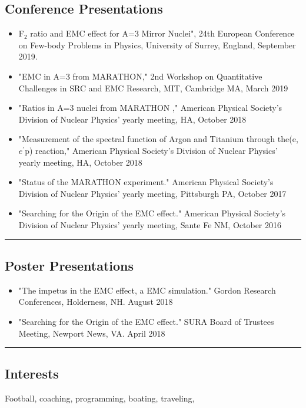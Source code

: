 \subsection*{Conference Presentations}
\begin{itemize}
\item F$_2$ ratio and EMC effect for A=3 Mirror Nuclei", 24th European Conference on Few-body Problems in Physics, University of Surrey, England, September 2019.
\item "EMC in A=3 from MARATHON," 2nd Workshop on Quantitative Challenges in SRC and EMC Research,  MIT, Cambridge MA,  March 2019
\item "Ratios in A=3 nuclei from MARATHON ," American Physical Society's Division of Nuclear Physics' yearly meeting, HA, October 2018
\item "Measurement of the spectral function of Argon and Titanium through the(e,$e^\prime$p) reaction," American Physical Society's Division of Nuclear Physics' yearly meeting, HA, October 2018
\item "Status of the MARATHON experiment." American Physical Society's Division of Nuclear Physics' yearly meeting, Pittsburgh PA, October 2017
\item "Searching for the Origin of the EMC effect." American Physical Society's Division of Nuclear Physics' yearly meeting, Sante Fe NM, October 2016
\end{itemize}

\hrule
\subsection*{Poster Presentations}
\begin{itemize}
\item "The impetus in the EMC effect, a EMC simulation." Gordon Research Conferences, Holderness, NH. August 2018 
\item "Searching for the Origin of the EMC effect." SURA Board of Trustees Meeting, Newport News, VA. April 2018 
\end{itemize}

\hrule

\subsection*{Interests}

Football, coaching, programming, boating, traveling,



